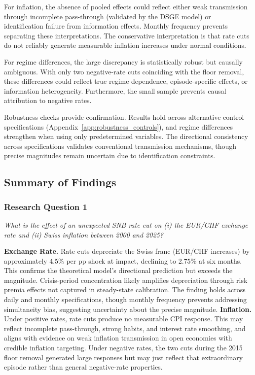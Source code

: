 \documentclass[12pt,a4paper]{article}
\begin{document}
For inflation, the absence of pooled effects could reflect either weak transmission through incomplete pass-through (validated by the DSGE model) or identification failure from information effects. Monthly frequency prevents separating these interpretations. The conservative interpretation is that rate cuts do not reliably generate measurable inflation increases under normal conditions.

For regime differences, the large discrepancy is statistically robust but causally ambiguous. With only two negative-rate cuts coinciding with the floor removal, these differences could reflect true regime dependence, episode-specific effects, or information heterogeneity. Furthermore, the small sample prevents causal attribution to negative rates.

Robustness checks provide confirmation. Results hold across alternative control specifications (Appendix~\ref{app:robustness_controls}), and regime differences strengthen when using only predetermined variables. The directional consistency across specifications validates conventional transmission mechanisms, though precise magnitudes remain uncertain due to identification constraints.
\subsection{Summary of Findings}
\label{subsec:answer_rq}
\subsubsection{Research Question 1}
\textit{What is the effect of an unexpected SNB rate cut on (i) the EUR/CHF exchange rate and (ii) Swiss inflation between 2000 and 2025?}

\textbf{Exchange Rate.} Rate cuts depreciate the Swiss franc (EUR/CHF increases) by approximately 4.5\% per pp shock at impact, declining to 2.75\% at six months. This confirms the theoretical model's directional prediction but exceeds the magnitude. Crisis-period concentration likely amplifies depreciation through risk premia effects not captured in steady-state calibration. The finding holds across daily and monthly specifications, though monthly frequency prevents addressing simultaneity bias, suggesting uncertainty about the precise magnitude.
\newpage
\textbf{Inflation.} Under positive rates, rate cuts produce no measurable CPI response. This may reflect incomplete pass-through, strong habits, and interest rate smoothing, and aligns with evidence on weak inflation transmission in open economies with credible inflation targeting. Under negative rates, the two cuts during the 2015 floor removal generated large responses but may just reflect that extraordinary episode rather than general negative-rate properties.
\end{document}
